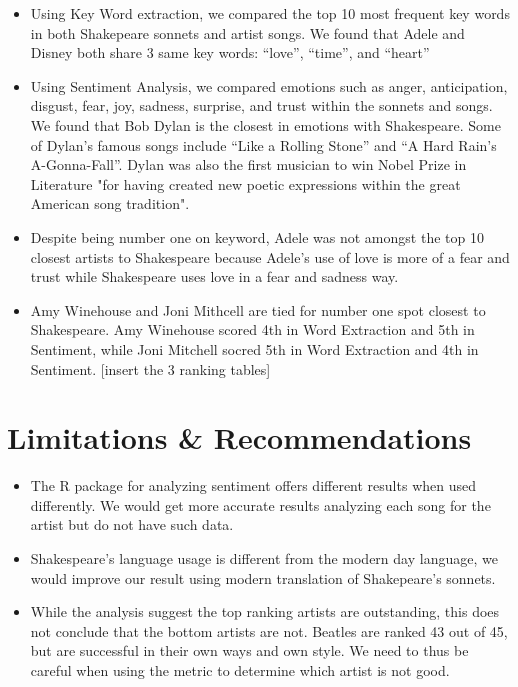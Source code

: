 \documentclass[11pt,a4paper]{article}
\begin{document}
\begin{itemize}

\item Using Key Word extraction, we compared the top 10 most frequent key words in both Shakepeare sonnets and artist songs. We found that Adele and Disney both share 3 same key words: “love”, “time”, and “heart”
\item Using Sentiment Analysis, we compared emotions such as anger, anticipation, disgust, fear, joy, sadness, surprise, and trust within the sonnets and songs. We found that Bob Dylan is the closest in emotions with Shakespeare. Some of Dylan’s famous songs include “Like a Rolling Stone” and “A Hard Rain’s A-Gonna-Fall”. Dylan was also the first musician to win Nobel Prize in Literature "for having created new poetic expressions within the great American song tradition".
\item Despite being number one on keyword, Adele was not amongst the top 10 closest artists to Shakespeare because Adele’s use of love is more of a fear and trust while Shakespeare uses love in a fear and sadness way.
\item Amy Winehouse and Joni Mithcell are tied for number one spot closest to Shakespeare. Amy Winehouse scored 4th in Word Extraction and 5th in Sentiment, while Joni Mitchell socred 5th in Word Extraction and 4th in Sentiment.  [insert the 3 ranking tables]

\end{itemize}


\section{Limitations \& Recommendations}
\begin{itemize}

\item The R package for analyzing sentiment offers different results when used differently. We would get more accurate results analyzing each song for the artist but do not have such data.
\item Shakespeare’s language usage is different from the modern day language, we would improve our result using modern translation of Shakepeare’s sonnets.
\item While the analysis suggest the top ranking artists are outstanding, this does not conclude that the bottom artists are not. Beatles are ranked 43 out of 45, but are successful in their own ways and own style. We need to thus be careful when using the metric to determine which artist is not good.

\end{itemize}
\end{document}
